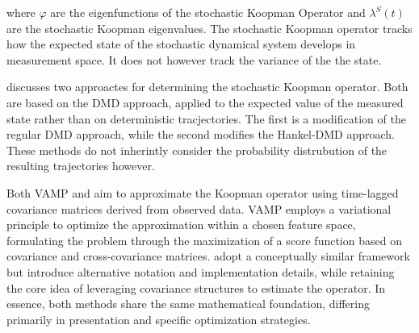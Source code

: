 where $\varphi$ are the eigenfunctions of the stochastic Koopman Operator and $\lambda^S(t)$ are the stochastic Koopman
eigenvalues. The stochastic Koopman operator tracks how the expected state of the stochastic dynamical system develops
in measurement space. It does not however track the variance of the the state.

\textcite{crnjaric-zicKoopmanOperatorSpectrum2020} discusses two approactes for determining the stochastic Koopman
operator. Both are based on the DMD approach, applied to the expected value of the measured state rather than on
deterministic tracjectories. The first is a modification of the regular DMD approach, while the second modifies the
Hankel-DMD approach. These methods do not inherintly consider the probability distrubution of the resulting
trajectories however.


Both VAMP \parencite{mardtVAMPnetsDeepLearning2018} and \textcite{zhaoDatadrivenProbabilityDensity2023} aim to approximate the Koopman operator using time-lagged covariance matrices derived from observed data. VAMP employs a variational principle to optimize the approximation within a chosen feature space, formulating the problem through the maximization of a score function based on covariance and cross-covariance matrices. \textcite{zhaoDatadrivenProbabilityDensity2023} adopt a conceptually similar framework but introduce alternative notation and implementation details, while retaining the core idea of leveraging covariance structures to estimate the operator. In essence, both methods share the same mathematical foundation, differing primarily in presentation and specific optimization strategies.




